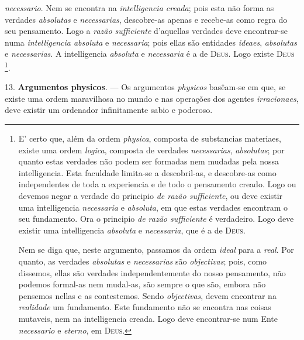  \emph{necessario}. Nem se encontra na \emph{intelligencia creada}; pois esta não forma as verdades \emph{absolutas} e \emph{necessarias}, descobre-as apenas e recebe-as como regra do seu pensamento. Logo a \emph{razão sufficiente} d'aquellas verdades deve encontrar-se numa \emph{intelligencia absoluta} e \emph{necessaria}; pois ellas são entidades \emph{ideaes}, \emph{absolutas} e \emph{necessarias}. A intelligencia \emph{absoluta} e \emph{necessaria} é a de \textsc{Deus}. Logo existe \textsc{Deus} \footnote{E' certo que, além da ordem \emph{physica}, composta de substancias materiaes, existe uma ordem \emph{logica}, composta de verdades \emph{necessarias}, \emph{absolutas}; por quanto estas verdades não podem ser formadas nem mudadas pela nossa intelligencia. Esta faculdade limita-se a descobril-as, e descobre-as como independentes de toda a experiencia e de todo o pensamento creado. Logo ou devemos negar a verdade do principio \emph{de razão sufficiente}, ou deve existir uma intelligencia \emph{necessaria} e \emph{absoluta}, em que estas verdades encontram o seu fundamento. Ora o principio \emph{de razão sufficiente} é verdadeiro. Logo deve existir uma intelligencia \emph{absoluta} e \emph{necessaria}, que é a de \textsc{Deus}.\par Nem se diga que, neste argumento, passamos da ordem \emph{ideal} para a \emph{real}. Por quanto, as verdades \emph{absolutas} e \emph{necessarias} são \emph{objectivas}; pois, como dissemos, ellas são verdades independentemente do nosso pensamento, não podemos formal-as nem mudal-as, são sempre o que são, embora não pensemos nellas e as contestemos. Sendo \emph{objectivas}, devem encontrar na \emph{realidade} um fundamento. Este fundamento não se encontra nas coisas mutaveis, nem na intelligencia creada. Logo deve encontrar-se num Ente \emph{necessario} e \emph{eterno}, em \textsc{Deus}.}.

13. \textbf{Argumentos physicos}. --- Os argumentos \emph{physicos} basêam-se em que, se existe uma ordem maravilhosa no mundo e nas operações dos agentes \emph{irracionaes}, deve existir um ordenador infinitamente sabio e poderoso.

